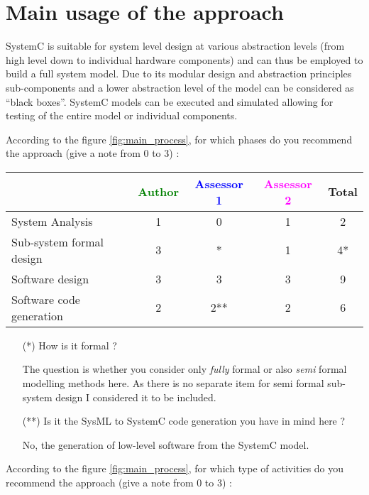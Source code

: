 \section{Main usage of the approach}
\label{main_usage}

SystemC is suitable for system level design at various abstraction levels (from high level down to individual hardware components) and can thus be employed to build a full system model. Due to its modular design and abstraction principles sub-components and a lower abstraction level of the model can be considered as ``black boxes''. SystemC models can be executed and simulated allowing for testing of the entire model or individual components.

According to the figure \ref{fig:main_process}, for which phases do you recommend the approach (give a note from 0 to 3) :

\begin{tabular}{|l | c | c | c | c|}
\hline
& \textcolor{green}{Author} & \textcolor{blue}{Assessor 1} & \textcolor{magenta}{Assessor 2} & Total \\
\hline
System Analysis &1 & 0 & 1 & 2 \\
\hline
Sub-system formal design & 3 & *  &  1 & 4* \\
\hline
Software design &3 &3 & 3 & 9 \\
\hline
Software code generation &2 & 2** & 2 & 6 \\
\hline
\end{tabular}
\begin{assessor1}
\begin{itemize}
\item[(*)] How is it formal ?
\begin{author_comment}
The question is whether you consider only \emph{fully} formal or also \emph{semi} formal modelling methods here. As there is no separate item for semi formal sub-system design I considered it to be included.
\end{author_comment}
\item[(**)] Is it the SysML to  SystemC code generation  you have in
  mind here ?
\begin{author_comment}
No, the generation of low-level software from the SystemC model.
\end{author_comment}
\end{itemize}
\end{assessor1}

According to the figure \ref{fig:main_process}, for which type of activities do you recommend the approach (give a note from 0 to 3) :

